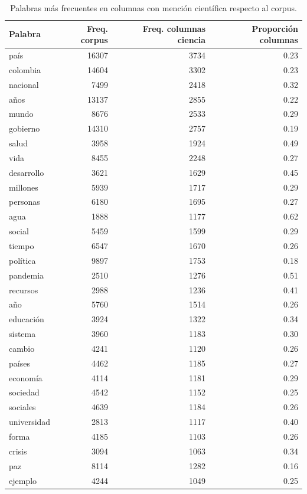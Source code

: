 \begin{table}[H]
\caption{Palabras más frecuentes en columnas con mención científica respecto al corpus.}
\label{tab:frecuencias_columnas}
\begin{tabular}{lrrr}
\toprule
Palabra & Freq. corpus & Freq. columnas ciencia & Proporción columnas \\
\midrule
país & 16307 & 3734 & 0.23 \\
colombia & 14604 & 3302 & 0.23 \\
nacional & 7499 & 2418 & 0.32 \\
años & 13137 & 2855 & 0.22 \\
mundo & 8676 & 2533 & 0.29 \\
gobierno & 14310 & 2757 & 0.19 \\
salud & 3958 & 1924 & 0.49 \\
vida & 8455 & 2248 & 0.27 \\
desarrollo & 3621 & 1629 & 0.45 \\
millones & 5939 & 1717 & 0.29 \\
personas & 6180 & 1695 & 0.27 \\
agua & 1888 & 1177 & 0.62 \\
social & 5459 & 1599 & 0.29 \\
tiempo & 6547 & 1670 & 0.26 \\
política & 9897 & 1753 & 0.18 \\
pandemia & 2510 & 1276 & 0.51 \\
recursos & 2988 & 1236 & 0.41 \\
año & 5760 & 1514 & 0.26 \\
educación & 3924 & 1322 & 0.34 \\
sistema & 3960 & 1183 & 0.30 \\
cambio & 4241 & 1120 & 0.26 \\
países & 4462 & 1185 & 0.27 \\
economía & 4114 & 1181 & 0.29 \\
sociedad & 4542 & 1152 & 0.25 \\
sociales & 4639 & 1184 & 0.26 \\
universidad & 2813 & 1117 & 0.40 \\
forma & 4185 & 1103 & 0.26 \\
crisis & 3094 & 1063 & 0.34 \\
paz & 8114 & 1282 & 0.16 \\
ejemplo & 4244 & 1049 & 0.25 \\
\bottomrule
\end{tabular}
\end{table}
